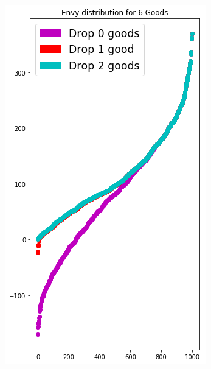 \begin{figure}[h!]
\begin{subfigure}[b]{0.47\linewidth}
    \includegraphics[width=\linewidth]{images/envy_density/envy_density_uv6.png}
    \caption{}
  \end{subfigure}
  \begin{subfigure}[b]{0.47\linewidth}

\end{subfigure}
\end{figure}
